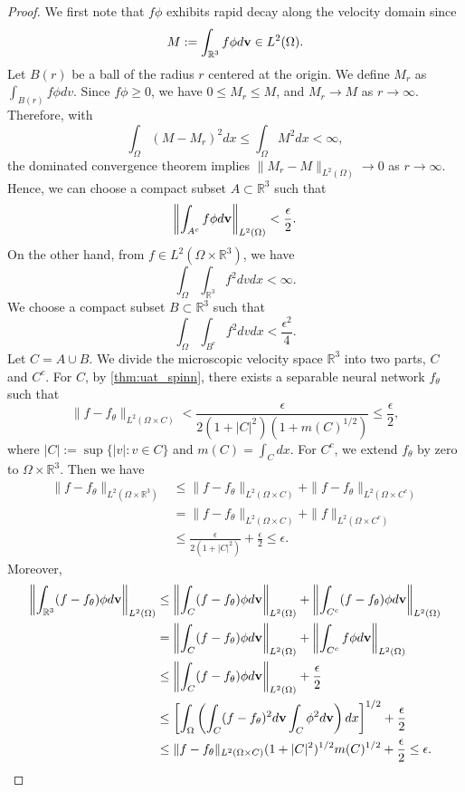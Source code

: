 \documentclass[preprint,12pt]{elsarticle}
\begin{document}
\begin{proof}
    We first note that $f\phi$ exhibits rapid decay along the velocity domain since
    \[
        M:= \int_{\mathbb{R}^3} f \phi d{\bf v} \in L^2(\Omega).
    \]
    Let \(B(r)\) be a ball of the radius \(r\) centered at the origin.
    We define $M_r$ as $\int_{B(r)} f\phi dv$.
    Since $f\phi \ge 0$, we have $0 \le M_r \le M$, and $M_r \rightarrow M$ as $r \rightarrow \infty$.
    Therefore, with
    \[
        \int_\Omega (M-M_r)^2 dx \le \int_\Omega M^2 dx < \infty,
    \]
    the dominated convergence theorem implies $\|M_r - M \|_{L^2(\Omega)} \rightarrow 0$ as $r \rightarrow \infty$.
    Hence, we can choose a compact subset $A \subset \mathbb{R}^3$ such that
    \[
        \left \| \int_{A^c} f \phi d{\bf v} \right\|_{L^2(\Omega)} < \frac{\epsilon}{2}.
    \]
    On the other hand, from $f \in L^2(\Omega \times \mathbb{R}^3)$, we have
    \[
        \int_\Omega\int_{\mathbb{R}^3} f^2 dv dx < \infty.
    \]
    We choose a compact subset $B \subset \mathbb{R}^3$ such that
    \[
        \int_\Omega \int_{B^c} f^2  dv dx < \frac{\epsilon^2}{4}.
    \]
    Let $C = A\cup B$.
    We divide the microscopic velocity space $\mathbb{R}^3$ into two parts, $C$ and $C^c$.
    For $C$, by \cref{thm:uat_spinn}, there exists a separable neural network $f_\theta$ such that 
    \[\| f - f_\theta \|_{L^2(\Omega \times C)} < \frac{\epsilon}{2(1+|C|^2)\left(1 + m(C)^{1/2}\right)} \le \frac{\epsilon}{2},\]
    where \(|C|:= \sup\{|v|: v \in C\}\) and \(m(C) = \int_C dx\).
    For $C^c$, we extend $f_\theta$ by zero to $\Omega \times \mathbb{R}^3$.
    Then we have
    \[
    \begin{split}
    \| f - f_\theta\|_{L^2(\Omega \times \mathbb{R}^3)}
    & \le \| f - f_\theta\|_{L^2(\Omega \times C)} + \| f - f_\theta \|_{L^2(\Omega \times C^c)} \\
    & = \| f - f_\theta\|_{L^2(\Omega \times C)} + \| f \|_{L^2(\Omega \times C^c)} \\
    & \le \frac{\epsilon}{2(1 + |C|^2)} + \frac{\epsilon}{2} \le \epsilon.
    \end{split}
    \]
    Moreover,
    \[
    \begin{split}
        \left\| \int_{\mathbb{R}^3} (f - f_\theta) \phi d{\bf v} \right\|_{L^2(\Omega)}
        & \le \left \| \int_C (f-f_\theta)\phi d{\bf v}\right \|_{L^2(\Omega)}
        + \left \| \int_{C^c} (f-f_\theta)\phi d{\bf v}\right \|_{L^2(\Omega)} \\
        & = \left \| \int_C (f-f_\theta)\phi d{\bf v}\right \|_{L^2(\Omega)}
        + \left \| \int_{C^c} f\phi d{\bf v}\right \|_{L^2(\Omega)} \\
        & \le \left \| \int_C (f-f_\theta)\phi d{\bf v}\right \|_{L^2(\Omega)} + \frac{\epsilon}{2} \\
        & \le  \left[\int_\Omega \left(\int_C (f-f_\theta)^2d{\bf v}\int_C \phi^2 d{\bf v}\right) dx\right]^{1/2} + \frac{\epsilon}{2} \\ 
        & \le \| f-f_\theta\|_{L^2(\Omega\times C)}(1+|C|^2)^{1/2}m(C)^{1/2} + \frac{\epsilon}{2}
        \le \epsilon.
    \end{split}
    \]
\end{proof}
\end{document}
